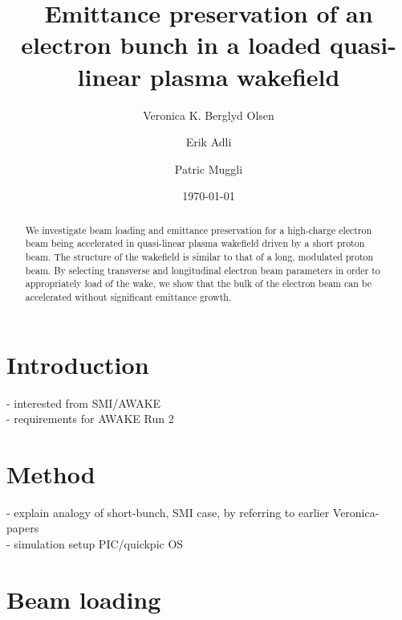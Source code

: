 \documentclass[aps,prstab,reprint,groupedaddress]{revtex4-1}
\begin{document}

\title{Emittance preservation of an electron bunch in a loaded quasi-linear plasma wakefield}

\author{Veronica K. Berglyd Olsen}

\author{Erik Adli}

\author{Patric Muggli}

\date{\today}

\begin{abstract}
We investigate beam loading and emittance preservation for a high-charge electron beam being accelerated in quasi-linear plasma wakefield driven by a short proton beam. The structure of the wakefield is similar to that of a long, modulated proton beam. By selecting transverse and longitudinal electron beam parameters in order to  appropriately load of the wake, we show that the bulk of the electron beam can be accelerated without significant emittance growth.
\end{abstract}

\maketitle

\section[\label{S:I}]{Introduction}

- interested from SMI/AWAKE \\
- requirements for AWAKE Run 2 \\

\section[\label{S:M}]{Method}

- explain analogy of short-bunch, SMI case, by referring to earlier Veronica-papers \\
- simulation setup PIC/quickpic OS \\

\section[\label{S:BL}]{Beam loading}
\end{document}
